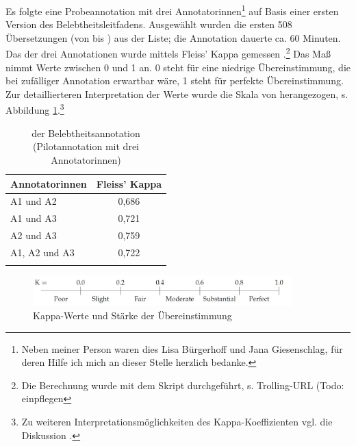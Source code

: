 Es folgte eine Probeannotation mit drei Annotatorinnen\footnote{Neben meiner Person waren dies Lisa Bürgerhoff und Jana Giesenschlag, für deren Hilfe ich mich an dieser Stelle herzlich bedanke.} auf Basis einer ersten Version des Belebtheitsleitfadens. Ausgewählt wurden die ersten 508 Übersetzungen (von  bis ) aus der Liste; die Annotation dauerte ca. 60 Minuten. Das  der drei Annotationen wurde mittels Fleiss' Kappa gemessen \parencite{Fleiss1971}.\footnote{Die Berechnung wurde mit dem Skript  durchgeführt, s. Trolling-URL (Todo: einpflegen} Das Maß nimmt Werte zwischen 0 und 1 an. 
0 steht für eine niedrige Übereinstimmung, die bei zufälliger Annotation erwartbar wäre, 1 steht für perfekte Übereinstimmung. Zur detaillierteren Interpretation der Werte wurde die Skala von \textcite{Landis1977} herangezogen, s. Abbildung \ref{abb:kappa-skala}.\footnote{Zu weiteren Interpretationsmöglichkeiten des Kappa-Koeffizienten vgl. die Diskussion \textcite[576--577]{Artstein2008}.}

\begin{table}
\centering
\label{tab:iaa-pilot}
\begin{tabular}{lc}
\lsptoprule
Annotatorinnen & Fleiss' Kappa  \\ \midrule
A1 und A2               & 0,686  \\
A1 und A3               & 0,721  \\
A2 und A3               & 0,759  \\
A1, A2 und A3           & 0,722  \\ \lspbottomrule
\end{tabular}
\caption{ der Belebtheitsannotation (Pilotannotation mit drei Annotatorinnen)}
\end{table}

\begin{figure}
\begin{center}
\includegraphics[width=10cm]{images/kappa-artstein.jpg}
\caption {Kappa-Werte und Stärke der Übereinstimmung \parencite[576]{Artstein2008}}
\label{abb:kappa-skala}
\end{center}
\end{figure} 


